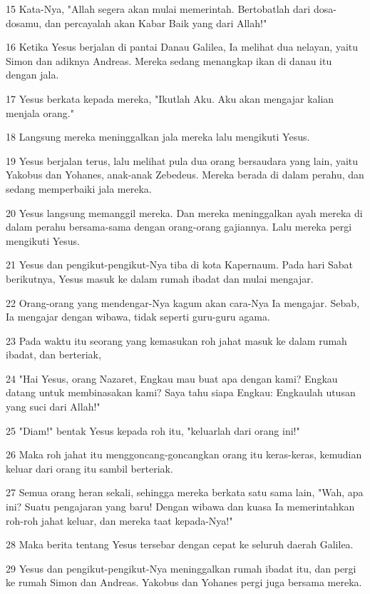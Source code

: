 \par 15 Kata-Nya, "Allah segera akan mulai memerintah. Bertobatlah dari dosa-dosamu, dan percayalah akan Kabar Baik yang dari Allah!"
\par 16 Ketika Yesus berjalan di pantai Danau Galilea, Ia melihat dua nelayan, yaitu Simon dan adiknya Andreas. Mereka sedang menangkap ikan di danau itu dengan jala.
\par 17 Yesus berkata kepada mereka, "Ikutlah Aku. Aku akan mengajar kalian menjala orang."
\par 18 Langsung mereka meninggalkan jala mereka lalu mengikuti Yesus.
\par 19 Yesus berjalan terus, lalu melihat pula dua orang bersaudara yang lain, yaitu Yakobus dan Yohanes, anak-anak Zebedeus. Mereka berada di dalam perahu, dan sedang memperbaiki jala mereka.
\par 20 Yesus langsung memanggil mereka. Dan mereka meninggalkan ayah mereka di dalam perahu bersama-sama dengan orang-orang gajiannya. Lalu mereka pergi mengikuti Yesus.
\par 21 Yesus dan pengikut-pengikut-Nya tiba di kota Kapernaum. Pada hari Sabat berikutnya, Yesus masuk ke dalam rumah ibadat dan mulai mengajar.
\par 22 Orang-orang yang mendengar-Nya kagum akan cara-Nya Ia mengajar. Sebab, Ia mengajar dengan wibawa, tidak seperti guru-guru agama.
\par 23 Pada waktu itu seorang yang kemasukan roh jahat masuk ke dalam rumah ibadat, dan berteriak,
\par 24 "Hai Yesus, orang Nazaret, Engkau mau buat apa dengan kami? Engkau datang untuk membinasakan kami? Saya tahu siapa Engkau: Engkaulah utusan yang suci dari Allah!"
\par 25 "Diam!" bentak Yesus kepada roh itu, "keluarlah dari orang ini!"
\par 26 Maka roh jahat itu menggoncang-goncangkan orang itu keras-keras, kemudian keluar dari orang itu sambil berteriak.
\par 27 Semua orang heran sekali, sehingga mereka berkata satu sama lain, "Wah, apa ini? Suatu pengajaran yang baru! Dengan wibawa dan kuasa Ia memerintahkan roh-roh jahat keluar, dan mereka taat kepada-Nya!"
\par 28 Maka berita tentang Yesus tersebar dengan cepat ke seluruh daerah Galilea.
\par 29 Yesus dan pengikut-pengikut-Nya meninggalkan rumah ibadat itu, dan pergi ke rumah Simon dan Andreas. Yakobus dan Yohanes pergi juga bersama mereka.
